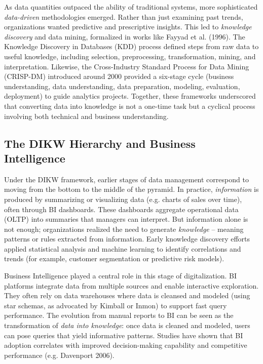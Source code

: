 As data quantities outpaced the ability of traditional systems, more sophisticated \emph{data-driven} methodologies emerged. Rather than just examining past trends, organizations wanted predictive and prescriptive insights. This led to \emph{knowledge discovery} and data mining, formalized in works like Fayyad et al. (1996). The Knowledge Discovery in Databases (KDD) process defined steps from raw data to useful knowledge, including selection, preprocessing, transformation, mining, and interpretation. Likewise, the Cross-Industry Standard Process for Data Mining (CRISP-DM) introduced around 2000 provided a six-stage cycle (business understanding, data understanding, data preparation, modeling, evaluation, deployment) to guide analytics projects. Together, these frameworks underscored that converting data into knowledge is not a one-time task but a cyclical process involving both technical and business understanding.

\subsection{The DIKW Hierarchy and Business Intelligence}
Under the DIKW framework, earlier stages of data management correspond to moving from the bottom to the middle of the pyramid. In practice, \emph{information} is produced by summarizing or visualizing data (e.g. charts of sales over time), often through BI dashboards. These dashboards aggregate operational data (OLTP) into summaries that managers can interpret. But information alone is not enough; organizations realized the need to generate \emph{knowledge} – meaning patterns or rules extracted from information. Early knowledge discovery efforts applied statistical analysis and machine learning to identify correlations and trends (for example, customer segmentation or predictive risk models).

Business Intelligence played a central role in this stage of digitalization. BI platforms integrate data from multiple sources and enable interactive exploration. They often rely on data warehouses where data is cleansed and modeled (using star schemas, as advocated by Kimball or Inmon) to support fast query performance. The evolution from manual reports to BI can be seen as the transformation of \emph{data into knowledge}: once data is cleaned and modeled, users can pose queries that yield informative patterns. Studies have shown that BI adoption correlates with improved decision-making capability and competitive performance (e.g. Davenport 2006).


